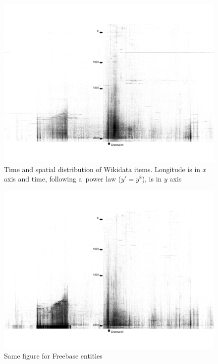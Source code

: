 \documentclass{sig-alternate}
\begin{document}
\begin{figure}[!htbp]
\centering
\includegraphics[width=8.45 cm]{img/wikidata-time-space.png}
\caption{Time and spatial distribution of Wikidata items.
Longitude is in $x$ axis and time, following a~power law ($y' = y^8$), is in $y$ axis}
\label{fig:time-space-wikidata}
\end{figure}

\begin{figure}[!htbp]
\centering
\includegraphics[width=8.45 cm]{img/freebase-time-space.png}
\caption{Same figure for Freebase entities}
\label{fig:time-space-freebase}
\end{figure}
\end{document}

